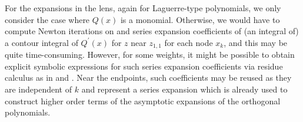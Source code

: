 \documentclass[11pt]{article}
\newcommand*{\todo}[1]{{\color{red}?? TODO: #1 ??}}
\newcommand*{\Pc}[1]{{\color{blue}#1}}
\numberwithin{equation}{section}
\begin{document}
For the expansions in the lens, again for Laguerre-type polynomials, we only consider the case where $Q(x)$ is a monomial. Otherwise, we would have to compute Newton iterations on and series expansion coefficients of (an integral of) a contour integral of $Q^\prime(x)$ %
for $z$ near $z_{1,1}$ for each node $x_k$, and this may be quite time-consuming. However, for some weights, it might be possible to obtain explicit symbolic expressions for such series expansion coefficients via residue calculus as in \cite[\S 5.2]{jacobi} and \cite[\S 3.4]{laguerre}. Near the endpoints, such coefficients may be reused as they are independent of $k$ and represent a series expansion which 
is already used to construct higher order terms of the asymptotic expansions of the orthogonal polynomials. 






\end{document}
